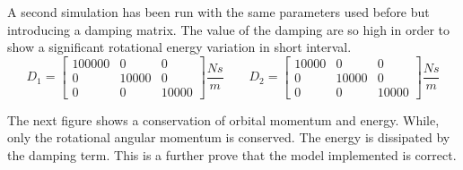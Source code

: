 \documentclass[]{BasiliskReportMemo}
\begin{document}
A second simulation has been run with the same parameters used before but introducing a damping matrix. The value of the damping are so high in order to show a significant rotational energy variation in short interval. 
\begin{equation}
D_1=
\begin{bmatrix}
100000 & 0 & 0\\
0 & 10000 & 0 \\
0 & 0 & 10000
\end{bmatrix} \frac{Ns}{m}
\qquad
D_2=
\begin{bmatrix}
10000 & 0 & 0\\
0 & 10000 & 0 \\
0 & 0 & 10000
\end{bmatrix} \frac{Ns}{m}
\end{equation}

The next figure shows a conservation of orbital momentum and energy. While, only the rotational angular momentum is conserved. The energy is dissipated by the damping term. This is a further prove that the model implemented is correct. 
\end{document}
